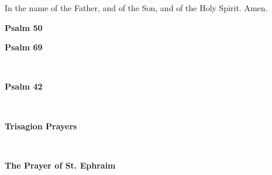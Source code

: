\begin{center}
\end{center}

In the name of the Father, and of the Son, and of the Holy Spirit. Amen.\\

\begin{center}
	\textbf{Psalm 50}
\end{center}


\begin{center}
	\textbf{Psalm 69}
\end{center}
\\

\begin{center}
	\textbf{Psalm 42}
\end{center}
\\

\begin{center}
	\textbf{Trisagion Prayers}
\end{center}
\\

\begin{center}
	\textbf{The Prayer of St. Ephraim}
\end{center}
\\